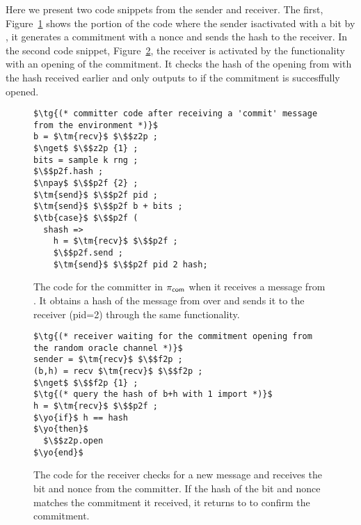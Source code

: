 Here we present two code snippets from the sender and receiver.
The first, Figure~\ref{lst:committer} shows the portion of the code where
the sender isactivated with a bit by \Z, it generates a commitment with a nonce and sends the hash to the receiver.
In the second code snippet, Figure~\ref{lst:receiver}, the receiver is activated by the functionality with an opening of the commitment. It checks the hash of the opening from \Fro with the hash received earlier and only outputs to \Z if the commitment is succesffully opened. 

\begin{figure}
\begin{lstlisting}[basicstyle=\footnotesize\BeraMonottFamily, frame=single, mathescape]
$\tg{(* committer code after receiving a 'commit' message from the environment *)}$
b = $\tm{recv}$ $\$$z2p ;
$\nget$ $\$$z2p {1} ;
bits = sample k rng ;
$\$$p2f.hash ;
$\npay$ $\$$p2f {2} ;
$\tm{send}$ $\$$p2f pid ;
$\tm{send}$ $\$$p2f b + bits ;
$\tb{case}$ $\$$p2f (
  shash => 
    h = $\tm{recv}$ $\$$p2f ;
    $\$$p2f.send ;
    $\tm{send}$ $\$$p2f pid 2 hash;
\end{lstlisting}
\caption{The code for the committer in $\pi_{{\mathsf {com}}}$ when it receives a  message from \Z. It obtains a hash of the message from \Fropp over  and sends it to the receiver (pid=2) through the same functionality.}
\label{lst:committer}
\vspace{-2mm}
\end{figure}
\begin{figure}
\begin{lstlisting}[basicstyle=\footnotesize\BeraMonottFamily, frame=single, mathescape]
$\tg{(* receiver waiting for the commitment opening from the random oracle channel *)}$
sender = $\tm{recv}$ $\$$f2p ;
(b,h) = recv $\tm{recv}$ $\$$f2p ;
$\nget$ $\$$f2p {1} ; 
$\tg{(* query the hash of b+h with 1 import *)}$
h = $\tm{recv}$ $\$$p2f ;
$\yo{if}$ h == hash
$\yo{then}$
  $\$$z2p.open
$\yo{end}$
\end{lstlisting}
\caption{The code for the receiver checks for a new message and receives the bit and nonce from the committer. If the hash of the bit and nonce matches the commitment it received, it returns  to \Z to confirm the commitment.}
\label{lst:receiver}
\vspace{-3mm}
\end{figure}

